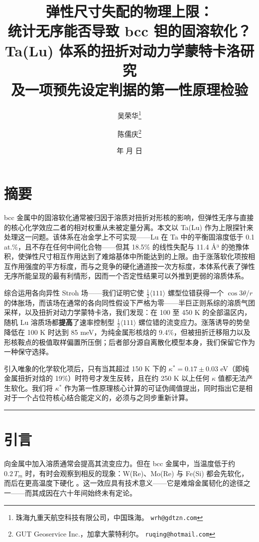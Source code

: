 \documentclass[11pt,a4paper]{article}
\title{\bfseries 弹性尺寸失配的物理上限：\\
统计无序能否导致 bcc 钽的固溶软化？\\[6pt]
\large Ta(Lu) 体系的扭折对动力学蒙特卡洛研究\\
及一项预先设定判据的第一性原理检验}
\author{吴荣华\thanks{珠海九重天航空科技有限公司，中国珠海。
\texttt{wrh@gdtzn.com}}
\and 陈儒庆\thanks{GUT Geoservice Inc.，加拿大蒙特利尔。
\texttt{ruqing@hotmail.com}}}
\date{\number\year 年 \number\month 月 \number\day 日}
\begin{document}
\maketitle


\hypertarget{ux6458ux8981}{%
\section*{摘要}\label{sec:ux6458ux8981}}

bcc 金属中的固溶软化通常被归因于溶质对扭折对形核的影响，但弹性无序与直接的核心化学效应二者的相对权重从未被定量分离。本文以 Ta(Lu) 作为上限探针来处理这一问题。该体系在冶金学上不可实现------Lu 在 Ta 中的平衡固溶度低于 0.1 at.\%，且不存在任何中间化合物------但其 18.5\% 的线性失配与 11.4 Å³ 的弛豫体积，使弹性尺寸相互作用达到了难熔基体中所能达到的上限。由于涨落软化项按相互作用强度的平方标度，而与之竞争的硬化通道按一次方标度，本体系代表了弹性无序所能呈现的最有利情形，因而一个否定性结果可以外推到更弱的溶质体系。

综合运用各向异性 Stroh 场------我们证明它使 \(\tfrac12\langle111\rangle\) 螺型位错获得一个 \(\cos3\theta/r\) 的体胀场，而该场在通常的各向同性假设下严格为零------半巨正则系综的溶质气团采样，以及扭折对动力学蒙特卡洛，我们发现：在 100 至 450 K 的全部温区内，随机 Lu 溶质场都\textbf{提高}了速率控制型 \(\tfrac12\langle111\rangle\) 螺位错的流变应力。涨落诱导的势垒降低在 100 K 时达到 85 meV，为纯金属形核焓的 9.4\%，但被扭折迁移阻力以及形核鞍点的极值取样偏置所压倒；后者部分源自离散化模型本身，我们保留它作为一种保守选择。

引入唯象的化学软化项后，只有当其超过 150 K 下的 \(\kappa^* = 0.17 \pm 0.03\) eV（即纯金属扭折对焓的 19\%）时符号才发生反转，且在约 250 K 以上任何 \(\kappa\) 值都无法产生软化。我们将 \(\kappa^*\) 作为第一性原理核心计算的可证伪阈值提出，同时指出它是相对于一个占位符核心结合能定义的，必须与之同步重新计算。

\begin{center}\rule{0.5\linewidth}{0.5pt}\end{center}

\hypertarget{ux5f15ux8a00}{%
\section{引言}\label{sec:ux5f15ux8a00}}

向金属中加入溶质通常会提高其流变应力。但在 bcc 金属中，当温度低于约 \(0.2\,T_m\) 时，有时会观察到相反的现象：W(Re)、Mo(Re) 与 Fe(Si) 都会先软化，而后在更高温度下硬化 \cite{christian1983}。这一效应具有技术意义------它是难熔金属韧化的途径之一------而其成因在六十年间始终未有定论。
\end{document}
